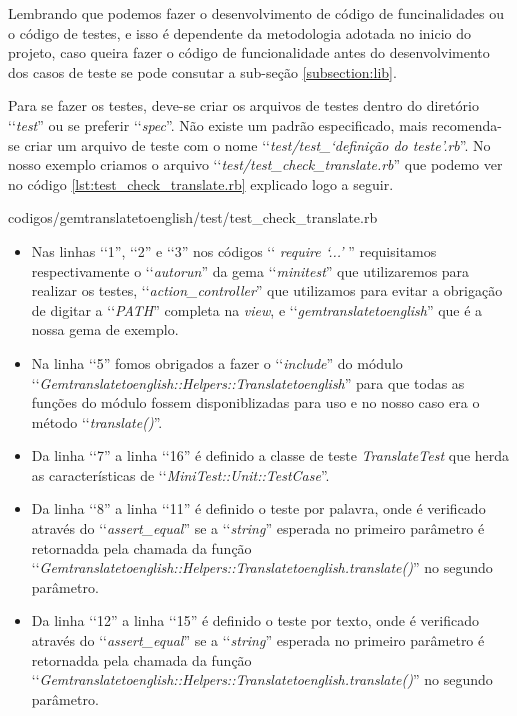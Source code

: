 Lembrando que podemos fazer o desenvolvimento de código de funcinalidades ou o código de testes, e isso é
dependente da metodologia adotada no inicio do projeto, caso queira fazer o código de funcionalidade antes
do desenvolvimento dos casos de teste se pode consutar a sub-seção \ref{subsection:lib}.

Para se fazer os testes, deve-se criar os arquivos de testes dentro do diretório ‘‘\emph{test}'' ou se 
preferir ‘‘\emph{spec}''. Não existe um padrão especificado, mais recomenda-se criar um arquivo de 
teste com o nome ‘‘\emph{test/test\_‘definição do teste'.rb}''. No nosso exemplo criamos o arquivo 
‘‘\emph{test/test\_check\_translate.rb}'' que podemo ver no código \ref{lst:test_check_translate.rb}
explicado logo a seguir.


{codigos/gemtranslatetoenglish/test/test_check_translate.rb}

\begin{itemize}

 \item Nas linhas ‘‘1'', ‘‘2'' e ‘‘3'' nos códigos ‘‘ \emph{require ‘...'} '' requisitamos respectivamente o 
 ‘‘\emph{autorun}'' da gema ‘‘\emph{minitest}'' que utilizaremos para realizar os testes, 
 ‘‘\emph{action\_controller}'' que utilizamos para evitar a obrigação de digitar a ‘‘\emph{PATH}'' completa 
 na \emph{view}, e ‘‘\emph{gemtranslatetoenglish}'' que é a nossa gema de exemplo.
 
 \item Na linha ‘‘5'' fomos obrigados a fazer o ‘‘\emph{include}'' do módulo 
 ‘‘\emph{Gemtranslatetoenglish::Helpers::Translatetoenglish}'' para que todas as funções do módulo fossem 
 disponiblizadas para uso e no nosso caso era o método ‘‘\emph{translate()}''.
 
 \item Da linha ‘‘7'' a linha ‘‘16'' é definido a classe de teste \emph{TranslateTest} que herda as 
 características de ‘‘\emph{MiniTest::Unit::TestCase}''.
 
 \item Da linha ‘‘8'' a linha ‘‘11'' é definido o teste por palavra, onde é verificado através do 
 ‘‘\emph{assert\_equal}'' se a ‘‘\emph{string}'' esperada no primeiro parâmetro é retornadda pela chamada 
 da função ‘‘\emph{Gemtranslatetoenglish::Helpers::Translatetoenglish.translate()}'' no segundo parâmetro.
  
 \item Da linha ‘‘12'' a linha ‘‘15'' é definido o teste por texto, onde é verificado através do 
 ‘‘\emph{assert\_equal}'' se a ‘‘\emph{string}'' esperada no primeiro parâmetro é retornadda pela chamada 
 da função ‘‘\emph{Gemtranslatetoenglish::Helpers::Translatetoenglish.translate()}'' no segundo parâmetro.
 
\end{itemize}

